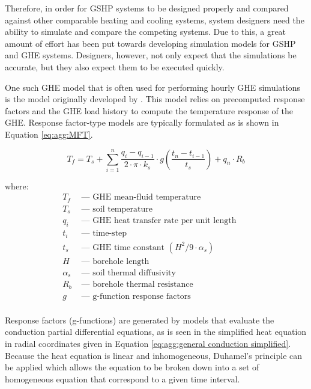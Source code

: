 \documentclass[review,12pt]{elsarticle}
\begin{document}
Therefore, in order for GSHP systems to be designed properly and compared against other comparable heating and cooling systems, system designers need the ability to simulate and compare the competing systems. Due to this, a great amount of effort has been put towards developing simulation models for GSHP and GHE systems. Designers, however, not only expect that the simulations be accurate, but they also expect them to be executed quickly.

One such GHE model that is often used for performing hourly GHE simulations is the model originally developed by \cite{EskilsonClaesson1988}. This model relies on precomputed response factors and the GHE load history to compute the temperature response of the GHE. Response factor-type models are typically formulated as is shown in Equation \ref{eq:agg:MFT}.

\begin{equation}
    T_f = T_s + \sum_{i=1}^n \frac{q_{i} - q_{i-1}}{2 \cdot \pi \cdot k_s} \cdot g\left(\frac{t_n - t_{i-1}}{t_s}\right) +  q_n \cdot R_b
    \label{eq:agg:MFT}
\end{equation}

where:
\begin{align*}
    T_f & \mbox{ --- GHE mean-fluid temperature} && \\
    T_s & \mbox{ --- soil temperature} && \\
    q_i & \mbox{ ---  GHE heat transfer rate per unit length} && \\
    t_i & \mbox{ --- time-step} && \\
    t_s & \mbox{ --- GHE time constant } \left(H^2 / 9\cdot\alpha_s\right) && \\
    H & \mbox{ --- borehole length} && \\
    \alpha_s & \mbox{ --- soil thermal diffusivity} && \\ 
    R_b & \mbox{ --- borehole thermal resistance} && \\
    g & \mbox{ --- g-function response factors} && \\
\end{align*}

Response factors (g-functions) are generated by models that evaluate the conduction partial differential equations, as is seen in the simplified heat equation in radial coordinates given in Equation \ref{eq:agg:general conduction simplified}. Because the heat equation is linear and inhomogeneous, Duhamel's principle can be applied which allows the equation to be broken down into a set of homogeneous equation that correspond to a given time interval. 
\end{document}
